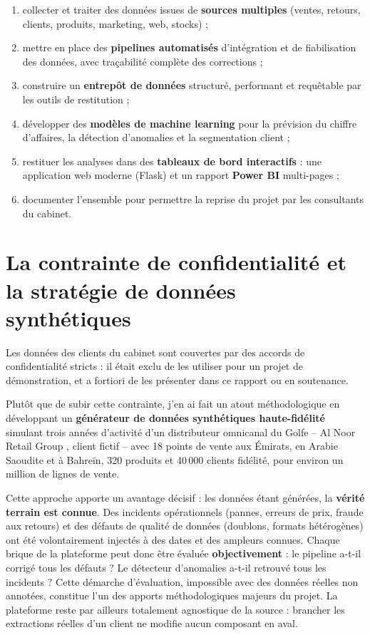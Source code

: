 \documentclass[12pt,a4paper]{report}
\begin{document}
\begin{enumerate}
  \item collecter et traiter des données issues de \textbf{sources multiples}
    (ventes, retours, clients, produits, marketing, web, stocks) ;
  \item mettre en place des \textbf{pipelines automatisés} d'intégration et de
    fiabilisation des données, avec traçabilité complète des corrections ;
  \item construire un \textbf{entrepôt de données} structuré, performant et
    requêtable par les outils de restitution ;
  \item développer des \textbf{modèles de machine learning} pour la prévision
    du chiffre d'affaires, la détection d'anomalies et la segmentation
    client ;
  \item restituer les analyses dans des \textbf{tableaux de bord interactifs} :
    une application web moderne (Flask) et un rapport \textbf{Power BI}
    multi-pages ;
  \item documenter l'ensemble pour permettre la reprise du projet par les
    consultants du cabinet.
\end{enumerate}

\section{La contrainte de confidentialité et la stratégie de données
  synthétiques}

Les données des clients du cabinet sont couvertes par des accords de
confidentialité stricts : il était exclu de les utiliser pour un projet de
démonstration, et a fortiori de les présenter dans ce rapport ou en soutenance.

Plutôt que de subir cette contrainte, j'en ai fait un atout méthodologique en
développant un \textbf{générateur de données synthétiques haute-fidélité}
simulant trois années d'activité d'un distributeur omnicanal du Golfe --
\og Al Noor Retail Group \fg{}, client fictif -- avec 18 points de vente aux
Émirats, en Arabie Saoudite et à Bahreïn, 320 produits et 40\,000 clients
fidélité, pour environ un million de lignes de vente.

Cette approche apporte un avantage décisif : les données étant générées, la
\textbf{vérité terrain est connue}. Des incidents opérationnels (pannes,
erreurs de prix, fraude aux retours) et des défauts de qualité de données
(doublons, formats hétérogènes) ont été volontairement injectés à des dates et
des ampleurs connues. Chaque brique de la plateforme peut donc être évaluée
\textbf{objectivement} : le pipeline a-t-il corrigé tous les défauts ? Le
détecteur d'anomalies a-t-il retrouvé tous les incidents ? Cette démarche
d'évaluation, impossible avec des données réelles non annotées, constitue l'un
des apports méthodologiques majeurs du projet. La plateforme reste par
ailleurs totalement agnostique de la source : brancher les extractions réelles
d'un client ne modifie aucun composant en aval.
\end{document}
